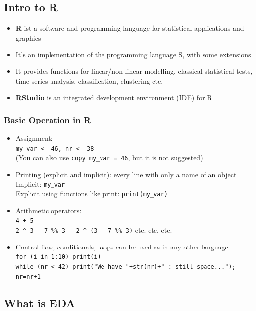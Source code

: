 \documentclass[a4paper]{article}
\begin{document}
		\subsection{Intro to R}
		
		\begin{itemize}
			\item \textbf{R} ist a software and programming language for statistical applications and graphics
			\item It's an implementation of the programming language S, with some extensions
			\item It provides functions for linear/non-linear modelling, classical statistical tests, time-series analysis, classification, clustering etc.
			\item \textbf{RStudio} is an integrated development environment (IDE) for R
		\end{itemize}
	
			\subsubsection{Basic Operation in R}
			
			\begin{itemize}
				\item Assignment:\\
					\texttt{my\_var <- 46, nr <- 38} \\
					(You can also use \texttt{copy my\_var = 46}, but it is not suggested)
				\item Printing (explicit and implicit): every line with only a name of an object \\
					Implicit: \texttt{my\_var} \\
					Explicit using functions like print: \texttt{print(my\_var)}
				\item Arithmetic operators: \\
					\texttt{4 + 5} \\
					\texttt{2 \^{} 3 - 7 \%\% 3 - 2 \^{} (3 - 7 \%\% 3)} etc. etc. etc.
				\item Control flow, conditionals, loops can be used as in any other language \\
					\texttt{for (i in 1:10) {print(i)}} \\
					\texttt{while (nr < 42) {print("We have "+str(nr)+" : still space..."); nr=nr+1}}
			\end{itemize}
	
		\subsection{What is EDA}
		
\end{document}
